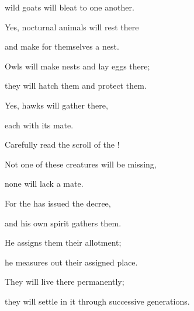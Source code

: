 {\par }{\Q wild goats
will bleat
to
one another.
\par }{\Q Yes,
nocturnal animals
will rest
there
\par }{\Q and make
for themselves a nest.
\par }{\Q {}Owls
will make nests
and lay eggs
there;
\par }{\Q they will hatch
them and protect
them.

\par }{\Q Yes, hawks
will gather
there,
\par }{\Q each with its mate.
\par }{\Q {}Carefully
read
the scroll
of the {}!

\par }{\Q Not
one
of these creatures
will be missing,
\par }{\Q none
will lack a mate.
\par }{\Q For
the
{}
has issued
the decree,
\par }{\Q and his own spirit
gathers them.
\par }{\Q {}He assigns
them
their allotment;
\par }{\Q he measures out
their assigned
place.

\par }{\Q They
will live
there permanently;
\par }{\Q they will settle
in it through successive generations.

\par }
